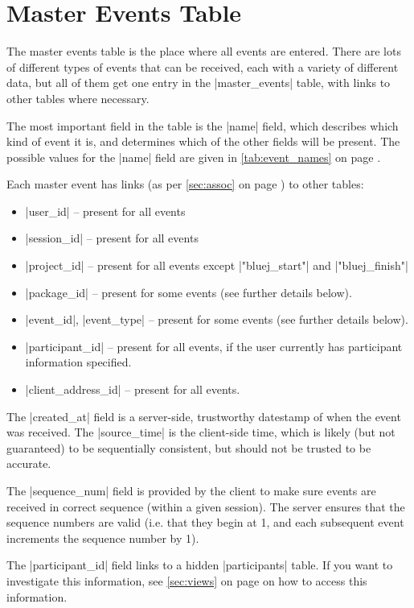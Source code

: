 \documentclass{report}
\newcommand{\myref}[1]{\autoref{#1} on page \pageref*{#1}}
\begin{document}
\chapter{Master Events Table}
\label{sec:master_events}

The master events table is the place where all events are entered.  There are
lots of different types of events that can be received, each with a variety of
different data, but all of them get one entry in the |master_events|
table, with links to other tables where necessary.


The most important field in the table is the |name| field, which describes
which kind of event it is, and determines which of the other fields will be
present.  The possible values for the |name| field are given in \myref{tab:event_names}.

Each master event has links (as per \myref{sec:assoc}) to other tables:
\begin{itemize}
\item |user_id| -- present for all events
\item |session_id| -- present for all events
\item |project_id| -- present for all events except |"bluej_start"| and |"bluej_finish"|
\item |package_id| -- present for some events (see further details below).
\item |event_id|, |event_type| -- present for some events (see further details below).
\item |participant_id| -- present for all events, if the user currently has
  participant information specified.
\item |client_address_id| -- present for all events.
\end{itemize}

The |created_at| field is a server-side, trustworthy datestamp of when
the event was received.  The |source_time| is the client-side time,
which is likely (but not guaranteed) to be sequentially consistent, but should
not be trusted to be accurate.

The |sequence_num| field is provided by the client to make sure events are
received in correct sequence (within a given session).  The server ensures
that the sequence numbers are valid (i.e. that they begin at 1, and each
subsequent event increments the sequence number by 1).


The |participant_id| field links to a hidden |participants| table.  If you
want to investigate this information, see \myref{sec:views} on how to
access this information.
\end{document}
